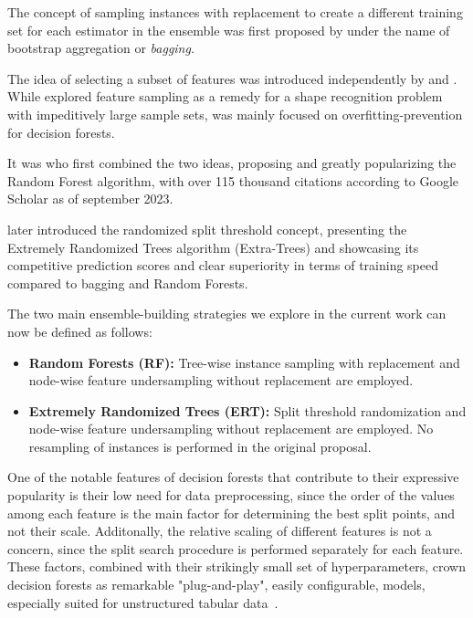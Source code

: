 The concept of sampling instances with replacement to create a different training set for each estimator in the ensemble was first proposed by \citet{breiman1996bagging} under the name of bootstrap aggregation or \emph{bagging}.

The idea of selecting a subset of features was introduced independently by \citet{amit1997shape} and \citet{tinkamho1998random}. While \citet{amit1997shape} explored feature sampling as a remedy for a shape recognition problem with impeditively large sample sets, \citet{tinkamho1998random} was mainly focused on overfitting-prevention for decision forests.

It was \citet{breiman2001random} who first combined the two ideas, proposing and greatly popularizing the Random Forest algorithm, with over 115 thousand citations according to Google Scholar as of september 2023.

\citet{geurts2006extremely} later introduced the randomized split threshold concept, presenting the Extremely Randomized Trees algorithm (Extra-Trees) and showcasing its competitive prediction scores and clear superiority in terms of training speed compared to bagging and Random Forests.

The two main ensemble-building strategies we explore in the current work can now be defined as follows:

\begin{itemize}
    \item \textbf{Random Forests (RF):} Tree-wise instance sampling with replacement and node-wise feature undersampling without replacement are employed.
    \item \textbf{Extremely Randomized Trees (ERT):} Split threshold randomization and node-wise feature undersampling without replacement are employed. No resampling of instances is performed in the original proposal.
\end{itemize}

One of the notable features of decision forests that contribute to their expressive popularity is their low need for data preprocessing, since the order of the values among each feature is the main factor for determining the best split points, and not their scale. Additonally, the relative scaling of different features is not a concern, since the split search procedure is performed separately for each feature. These factors, combined with their strikingly small set of hyperparameters, crown decision forests as remarkable "plug-and-play", easily configurable, models, especially suited for unstructured tabular data~\cite{breiman2001}. %

